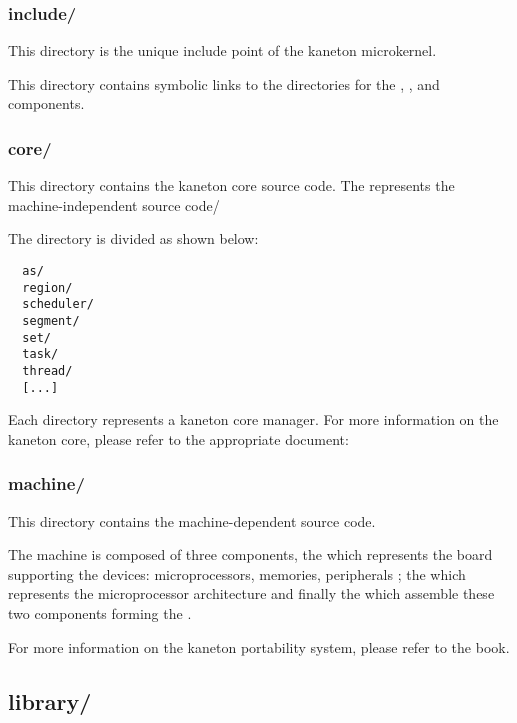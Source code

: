 
\subsubsection*{include/}

This directory is the unique include point of the kaneton microkernel.

This directory contains symbolic links to the  directories
for the , ,  and 
components.


\subsubsection*{core/}

This directory contains the kaneton core source code. The 
represents the machine-independent source code/

The directory is divided as shown below:

\begin{verbatim}
  as/
  region/
  scheduler/
  segment/
  set/
  task/
  thread/
  [...]
\end{verbatim}

Each directory represents a kaneton core manager. For more information on
the kaneton core, please refer to the appropriate document:


\subsubsection*{machine/}

This directory contains the machine-dependent source code.

The machine is composed of three components, the  which
represents the board supporting the devices: microprocessors, memories,
peripherals \etc{}; the  which represents the microprocessor
architecture and finally the  which assemble these two
components forming the .

For more information on the kaneton portability system, please refer to the
 book.

%
%

\subsection*{library/}

